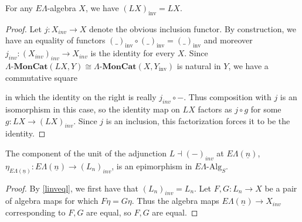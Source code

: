 \documentclass{amsbook} %
\newcommand{\mb}{\mathbf}
\newcommand{\ELAlg}{\lmc}
\newcommand{\lmc}{\Lambda\mbox{-}\mb{MonCat}}
\numberwithin{section}{chapter}
\begin{document}
\begin{prop} \label{linveql} For any $E\Lambda$-algebra $X$, we have $(LX)_{\mathrm{inv}} = LX$.
\end{prop}
\begin{proof}
Let $j: X_{inv} \to X$ denote the obvious inclusion functor. By construction, we have an equality of functors $(\_)_{\mathrm{inv}} \circ (\_)_{\mathrm{inv}} = (\_)_{\mathrm{inv}}$ and moreover $j_{inv}: (X_{inv})_{inv} \to X_{inv}$ is the identity for every $X$. Since $\ELAlg(LX , Y)\cong \ELAlg(X, Y_{\mathrm{inv}})$ is natural in $Y$, we have a commutative square
\begin{center}
    \end{center}
in which the identity on the right is really $j_{inv} \circ -$. Thus composition with $j$ is an isomorphism in this case, so the identity map on $LX$ factors as $j \circ g$ for some $g: LX \to (LX)_{inv}$. Since $j$ is an inclusion, this factorization forces it to be the identity.
\end{proof}

\begin{cor} \label{epi} The component of the unit of the adjunction $L \dashv (-)_{inv}$ at $E\Lambda(\underline{n})$,  $\eta_{E\Lambda(\underline{n})}: E\Lambda(\underline{n}) \to (L_n)_{inv}$, is an epimorphism in $E\Lambda\mbox{-}\mathrm{Alg}_S$.
\end{cor}
\begin{proof}
By \cref{linveql}, we first have that $(L_n)_{inv} = L_n$. Let $F,G: L_n \to X$ be a pair of algebra maps for which $F \eta = G \eta$. Thus the algebra maps $E\Lambda(\underline{n}) \to X_{inv}$ corresponding to $F, G$ are equal, so $F,G$ are equal.
\end{proof}

\end{document}
